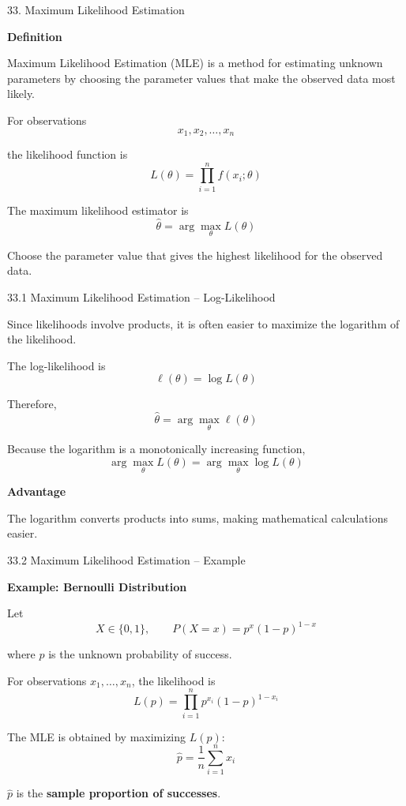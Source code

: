 
\begin{frame}{33. Maximum Likelihood Estimation}

\textbf{Definition}

Maximum Likelihood Estimation (MLE) is a method for estimating
unknown parameters by choosing the parameter values that make
the observed data most likely.

For observations
\[
x_1,x_2,\ldots,x_n
\]

the likelihood function is
\[
\boxed{
L(\theta)
=
\prod_{i=1}^{n}f(x_i;\theta)
}
\]

The maximum likelihood estimator is
\[
\boxed{
\hat{\theta}
=
\arg\max_{\theta}L(\theta)
}
\]

Choose the parameter value that gives the highest likelihood
for the observed data.

\end{frame}



\begin{frame}{33.1 Maximum Likelihood Estimation -- Log-Likelihood}

Since likelihoods involve products, it is often easier to
maximize the logarithm of the likelihood.

The log-likelihood is
\[
\boxed{
\ell(\theta)=\log L(\theta)
}
\]

Therefore,
\[
\boxed{
\hat{\theta}
=
\arg\max_{\theta}\ell(\theta)
}
\]

Because the logarithm is a monotonically increasing function,
\[
\arg\max_{\theta}L(\theta)
=
\arg\max_{\theta}\log L(\theta)
\]

\textbf{Advantage}

The logarithm converts products into sums, making
mathematical calculations easier.

\end{frame}



\begin{frame}{33.2 Maximum Likelihood Estimation -- Example}

\textbf{Example: Bernoulli Distribution}

Let
\[
X\in\{0,1\}, \qquad P(X=x)=p^x(1-p)^{1-x}
\]

where $p$ is the unknown probability of success.

For observations $x_1,\ldots,x_n$, the likelihood is
\[
L(p)=\prod_{i=1}^{n}p^{x_i}(1-p)^{1-x_i}
\]

The MLE is obtained by maximizing $L(p)$:
\[
\boxed{\hat{p}=\frac{1}{n}\sum_{i=1}^{n}x_i}
\]

$\hat p$ is the \textbf{sample proportion of successes}.

\end{frame}


